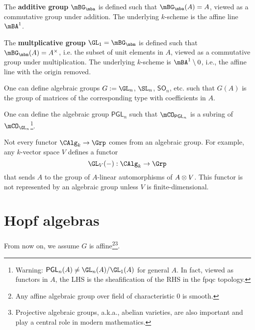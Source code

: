 \begin{exam}
	The \textbf{additive group} $\mBG_\mba$ is defined such that $\mBG_\mba(A) = A$, viewed as a commutative group under addition. The underlying $k$-scheme is the affine line $\mBA^1$.
\end{exam}

\begin{exam}
	The \textbf{multplicative group} $\GL_1 = \mBG_\mbm$ is defined such that $\mBG_\mbm(A) = A^\times$, i.e. the subset of unit elements in $A$, viewed as a commutative group under multiplication. The underlying $k$-scheme is $\mBA^1 \setminus 0$, i.e., the affine line with the origin removed.
\end{exam}

\begin{exam}
	One can define algebraic groups $G:=\GL_n$, $\SL_n$, $\mathsf{SO}_n$, etc. such that $G(A)$ is the group of matrices of the corresponding type with coefficients in $A$. 
\end{exam}

\begin{exam}
	One can define the algebraic group $\mathsf{PGL}_n$ such that $\mCO_{ \mathsf{PGL}_n }$ is a subring of $\mCO_{\GL_n}$\footnote{Warning: $\mathsf{PGL}_n(A)\neq \GL_n(A)/\GL_1(A)$ for general $A$. In fact, viewed as functors in $A$, the LHS is the sheafification of the RHS in the fpqc topology.}.
\end{exam}

\begin{rem}
	Not every functor $\CAlg_k \to \Grp$ comes from an algebraic group. For example, any $k$-vector space $V$ defines a functor
	\[
		\GL_V(-): \CAlg_k \to \Grp
	\]
	that sends $A$ to the group of $A$-linear automorphisms of $A\ot V$. This functor is not represented by an algebraic group unless $V$ is finite-dimensional.
\end{rem}

\section{Hopf algebras}
	From now on, we assume $G$ is affine\footnote{Any affine algebraic group over field of characteristic $0$ is smooth.}\footnote{Projective algebraic groups, a.k.a., abelian varieties, are also important and play a central role in modern mathematics.}.

